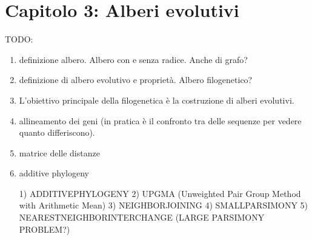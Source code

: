 \chapter{Capitolo 3: Alberi evolutivi}
TODO:
\begin{enumerate}
	\item definizione albero. Albero con e senza radice. Anche di grafo?
	\item definizione di albero evolutivo e proprietà. Albero filogenetico?
	\item L'obiettivo principale della filogenetica è la costruzione di alberi evolutivi.
	\item allineamento dei geni (in pratica è il confronto tra delle sequenze per vedere quanto differiscono).
	\item matrice delle distanze
	\item additive phylogeny
	
	1) ADDITIVEPHYLOGENY
2) UPGMA (Unweighted Pair Group Method with Arithmetic Mean)
3) NEIGHBORJOINING
4) SMALLPARSIMONY
5) NEARESTNEIGHBORINTERCHANGE (LARGE PARSIMONY PROBLEM?)
\end{enumerate}
